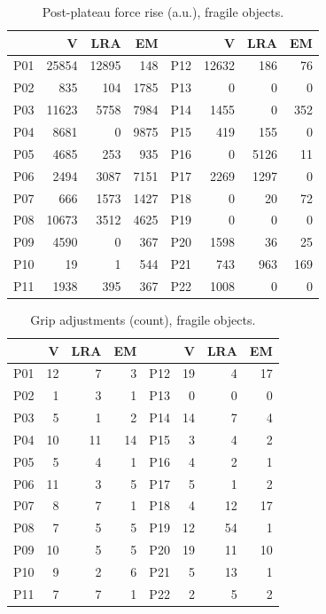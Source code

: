 \documentclass[12pt, a4paper, twoside, openright]{report}
\begin{document}
\begin{table}[ht]
    \centering
    \small
    \caption{Post-plateau force rise (a.u.), fragile objects.}
    \label{tab:appB-frag-excess}
    \begin{tabular}{@{}lrrr@{\hspace{2em}}lrrr@{}}
        \toprule
            & V     & LRA   & EM   &     & V     & LRA  & EM  \\
        \midrule
        P01 & 25854 & 12895 & 148  & P12 & 12632 & 186  & 76  \\
        P02 & 835   & 104   & 1785 & P13 & 0     & 0    & 0   \\
        P03 & 11623 & 5758  & 7984 & P14 & 1455  & 0    & 352 \\
        P04 & 8681  & 0     & 9875 & P15 & 419   & 155  & 0   \\
        P05 & 4685  & 253   & 935  & P16 & 0     & 5126 & 11  \\
        P06 & 2494  & 3087  & 7151 & P17 & 2269  & 1297 & 0   \\
        P07 & 666   & 1573  & 1427 & P18 & 0     & 20   & 72  \\
        P08 & 10673 & 3512  & 4625 & P19 & 0     & 0    & 0   \\
        P09 & 4590  & 0     & 367  & P20 & 1598  & 36   & 25  \\
        P10 & 19    & 1     & 544  & P21 & 743   & 963  & 169 \\
        P11 & 1938  & 395   & 367  & P22 & 1008  & 0    & 0   \\
        \bottomrule
    \end{tabular}
\end{table}

\begin{table}[ht]
    \centering
    \small
    \caption{Grip adjustments (count), fragile objects.}
    \label{tab:appB-frag-adj}
    \begin{tabular}{@{}lrrr@{\hspace{2em}}lrrr@{}}
        \toprule
            & V  & LRA & EM &     & V  & LRA & EM \\
        \midrule
        P01 & 12 & 7   & 3  & P12 & 19 & 4   & 17 \\
        P02 & 1  & 3   & 1  & P13 & 0  & 0   & 0  \\
        P03 & 5  & 1   & 2  & P14 & 14 & 7   & 4  \\
        P04 & 10 & 11  & 14 & P15 & 3  & 4   & 2  \\
        P05 & 5  & 4   & 1  & P16 & 4  & 2   & 1  \\
        P06 & 11 & 3   & 5  & P17 & 5  & 1   & 2  \\
        P07 & 8  & 7   & 1  & P18 & 4  & 12  & 17 \\
        P08 & 7  & 5   & 5  & P19 & 12 & 54  & 1  \\
        P09 & 10 & 5   & 5  & P20 & 19 & 11  & 10 \\
        P10 & 9  & 2   & 6  & P21 & 5  & 13  & 1  \\
        P11 & 7  & 7   & 1  & P22 & 2  & 5   & 2  \\
        \bottomrule
    \end{tabular}
\end{table}
\end{document}
